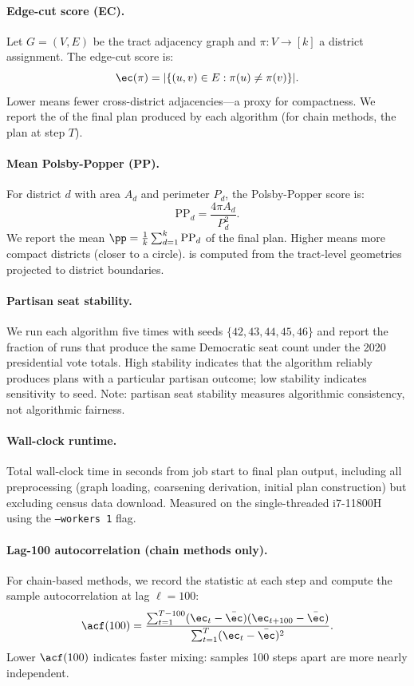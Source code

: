 \paragraph{Edge-cut score (EC).}
Let $G = (V, E)$ be the tract adjacency graph and $\pi : V \to [k]$
a district assignment.
The edge-cut score is:
\[
  \ec(\pi) = |\{(u,v) \in E : \pi(u) \neq \pi(v)\}|.
\]
Lower \ec{} means fewer cross-district adjacencies---a proxy for
compactness.
We report the \ec{} of the final plan produced by each algorithm
(for chain methods, the plan at step $T$).

\paragraph{Mean Polsby-Popper (PP).}
For district $d$ with area $A_d$ and perimeter $P_d$, the Polsby-Popper
score is:
\[
  \mathrm{PP}_d = \frac{4\pi A_d}{P_d^2}.
\]
We report the mean $\pp = \frac{1}{k} \sum_{d=1}^k \mathrm{PP}_d$ of the
final plan.
Higher \pp{} means more compact districts (closer to a circle).
\pp{} is computed from the tract-level geometries projected to district
boundaries.

\paragraph{Partisan seat stability.}
We run each algorithm five times with seeds $\{42, 43, 44, 45, 46\}$ and
report the fraction of runs that produce the same Democratic seat count
under the 2020 presidential vote totals.
High stability indicates that the algorithm reliably produces plans with a
particular partisan outcome; low stability indicates sensitivity to
seed.
Note: partisan seat stability measures algorithmic consistency, not
algorithmic fairness.

\paragraph{Wall-clock runtime.}
Total wall-clock time in seconds from job start to final plan output,
including all preprocessing (graph loading, coarsening derivation, initial
plan construction) but excluding census data download.
Measured on the single-threaded i7-11800H using the
\texttt{--workers~1} flag.

\paragraph{Lag-100 autocorrelation (chain methods only).}
For chain-based methods, we record the \ec{} statistic at each step and
compute the sample autocorrelation at lag $\ell = 100$:
\[
  \acf(100) = \frac{\sum_{t=1}^{T-100} (\ec_t - \bar{\ec})
                    (\ec_{t+100} - \bar{\ec})}
                   {\sum_{t=1}^{T} (\ec_t - \bar{\ec})^2}.
\]
Lower $\acf(100)$ indicates faster mixing: samples 100 steps apart are
more nearly independent.

